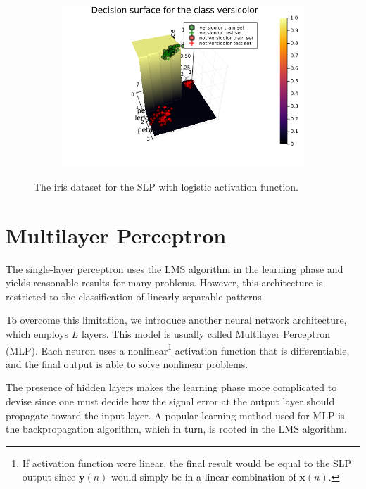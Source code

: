 \documentclass[12pt,a4paper]{article}
\begin{document}
\begin{figure}[H]\ContinuedFloat
    \centering
    \begin{subfigure}{0.6\textwidth}
        \includegraphics[scale=.4]{../trab4 (single layer perceptron with sigmoidal functions)/figs/decision-surface-for-versicolor.png}
    \end{subfigure}
    \caption{The iris dataset for the SLP with logistic activation function.}
    \label{fig:iris-decision-surface}
\end{figure}

\section{Multilayer Perceptron}

The single-layer perceptron uses the LMS algorithm in the learning phase and yields reasonable results for many problems. However, this architecture is restricted to the classification of linearly separable patterns.

To overcome this limitation, we introduce another neural network architecture, which employs \(L\) layers. This model is usually called Multilayer Perceptron (MLP). Each neuron uses a nonlinear\footnote{If activation function were linear, the final result would be equal to the SLP output since \(\mathbf{y}(n)\) would simply be in a linear combination of \(\mathbf{x}(n)\).} activation function that is differentiable, and the final output is able to solve nonlinear problems.

The presence of hidden layers makes the learning phase more complicated to devise since one must decide how the signal error at the output layer should propagate toward the input layer. A popular learning method used for MLP is the backpropagation algorithm, which in turn, is rooted in the LMS algorithm.
\end{document}
